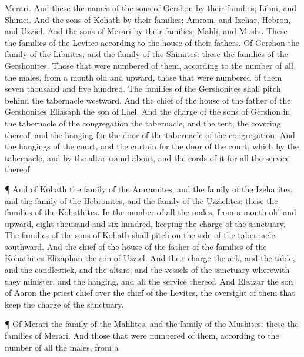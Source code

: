 {Merari.
And these
{} the
names of the
sons of
Gershon by their
families;
Libni, and
Shimei.
And the
sons of
Kohath by their
families;
Amram, and
Izehar,
Hebron, and
Uzziel.
And the
sons of
Merari by their
families;
Mahli, and
Mushi. These
{} the
families of the
Levites according to the
house of their
fathers.
Of
Gershon
{} the
family of the
Libnites, and the
family of the
Shimites: these
{} the
families of the
Gershonites.
Those that were
numbered of them, according to the
number of all the
males, from a
month
old and
upward,
{} those that were
numbered of them
{}
seven
thousand and
five
hundred.
The
families of the
Gershonites shall
pitch
behind the
tabernacle
westward.
And the
chief of the
house of the
father of the
Gershonites
{}
Eliasaph the
son of
Lael.
And the
charge of the
sons of
Gershon in the
tabernacle of the
congregation
{} the
tabernacle, and the
tent, the
covering thereof, and the
hanging for the
door of the
tabernacle of the
congregation,
And the
hangings of the
court, and the
curtain for the
door of the
court, which
{} by the
tabernacle, and by the
altar round
about, and the
cords of it for all the
service thereof.
\par }{\PP {}¶ And of
Kohath
{} the
family of the
Amramites, and the
family of the
Izeharites, and the
family of the
Hebronites, and the
family of the
Uzzielites: these
{} the
families of the
Kohathites.
In the
number of all the
males, from a
month
old and
upward,
{}
eight
thousand and
six
hundred,
keeping the
charge of the
sanctuary.
The
families of the
sons of
Kohath shall
pitch on the
side of the
tabernacle
southward.
And the
chief of the
house of the
father of the
families of the
Kohathites
{}
Elizaphan the
son of
Uzziel.
And their
charge
{} the
ark, and the
table, and the
candlestick, and the
altars, and the
vessels of the
sanctuary wherewith they
minister, and the
hanging, and all the
service thereof.
And
Eleazar the
son of
Aaron the
priest
{}
chief over the
chief of the
Levites,
{} the
oversight of them that
keep the
charge of the
sanctuary.
\par }{\PP {}¶ Of
Merari
{} the
family of the
Mahlites, and the
family of the
Mushites: these
{} the
families of
Merari.
And those that were
numbered of them, according to the
number of all the
males, from a
}
